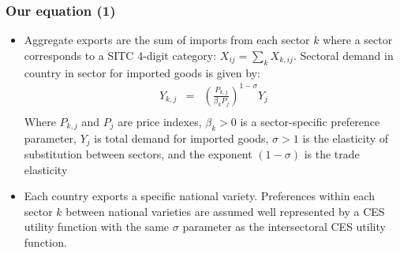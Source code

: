 \documentclass{beamer}
\begin{document}
\begin{frame}[plain]\frametitle{Our equation (1)}
\begin{itemize}
	\item Aggregate exports are the sum of imports from each sector $k$ where a sector corresponds to a SITC 4-digit category: ${{X}_{ij}}=\sum\limits_{k}{{{X}_{k,ij}}}$.
	Sectoral demand in country  in sector  for imported goods is given by: 
	\[\begin{array}{*{35}{l}}
	{{Y}_{k,j}} & = & {{\left( \frac{{{P}_{k,j}}}{{{\beta }_{k}}{{P}_{j}}} \right)}^{1-\sigma }}{{Y}_{j}}  \\
	\end{array}\]
	Where ${{P}_{k,j}}$ and ${{P}_{j}}$ are price indexes, ${{\beta }_{k}}>0$ is a sector-specific preference parameter, ${{Y}_{j}}$ is total demand for imported goods, $\sigma >1$ is the elasticity of substitution between sectors, and the exponent $\left( 1-\sigma \right)$ is the trade elasticity
	\item Each country exports a specific national variety. Preferences within each sector $k$ between national varieties are assumed well represented by a CES utility function with the same $\sigma $ parameter as the intersectoral CES utility function.
\end{itemize}
\end{frame}
\end{document}
